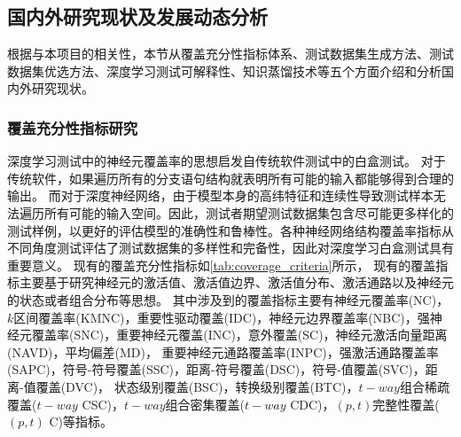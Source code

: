 \subsection{国内外研究现状及发展动态分析}\label{relatedwork}


根据与本项目的相关性，本节从覆盖充分性指标体系、测试数据集生成方法、测试数据集优选方法、深度学习测试可解释性、知识蒸馏技术等五个方面介绍和分析国内外研究现状。




\subsubsection{覆盖充分性指标研究}

深度学习测试中的神经元覆盖率的思想启发自传统软件测试中的白盒测试。
对于传统软件，如果遍历所有的分支语句结构就表明所有可能的输入都能够得到合理的输出。
而对于深度神经网络，由于模型本身的高纬特征和连续性导致测试样本无法遍历所有可能的输入空间。因此，测试者期望测试数据集包含尽可能更多样化的测试样例，以更好的评估模型的准确性和鲁棒性。各种神经网络结构覆盖率指标从不同角度测试评估了测试数据集的多样性和完备性，因此对深度学习白盒测试具有重要意义。
现有的覆盖充分性指标如\cref{tab:coverage_criteria}所示，
现有的覆盖指标主要基于研究神经元的激活值、激活值边界、激活值分布、激活通路以及神经元的状态或者组合分布等思想。
其中涉及到的覆盖指标主要有神经元覆盖率(NC)，$k$区间覆盖率(KMNC)，重要性驱动覆盖(IDC)，神经元边界覆盖率(NBC)，强神经元覆盖率(SNC)，重要神经元覆盖(INC)，意外覆盖(SC)，神经元激活向量距离(NAVD)，平均偏差(MD)，
重要神经元通路覆盖率(INPC)，强激活通路覆盖率(SAPC)，符号-符号覆盖(SSC)，距离-符号覆盖(DSC)，符号-值覆盖(SVC)，距离-值覆盖(DVC)，
状态级别覆盖(BSC)，转换级别覆盖(BTC)，$t-way$组合稀疏覆盖($t-way$ CSC)，$t-way$组合密集覆盖($t-way$ CDC)，$(p,t)$完整性覆盖($(p,t)$ C)等指标。

